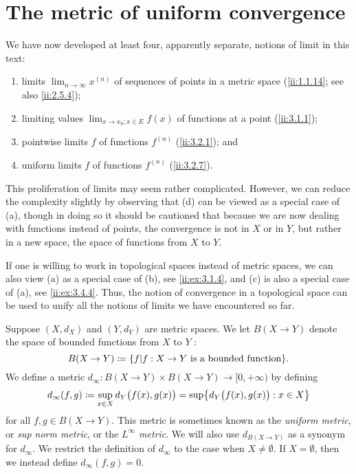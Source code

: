 \section{The metric of uniform convergence}\label{ii:sec:3.4}

\begin{note}
  We have now developed at least four, apparently separate, notions of limit in this text:
  \begin{enumerate}
    \item limits \(\lim_{n \to \infty} x^{(n)}\) of sequences of points in a metric space
          (\cref{ii:1.1.14};
          see also \cref{ii:2.5.4});
    \item limiting values \(\lim_{x \to x_0 ; x \in E} f(x)\) of functions at a point
          (\cref{ii:3.1.1});
    \item pointwise limits \(f\) of functions \(f^{(n)}\)
          (\cref{ii:3.2.1});
          and
    \item uniform limits \(f\) of functions \(f^{(n)}\)
          (\cref{ii:3.2.7}).
  \end{enumerate}

  This proliferation of limits may seem rather complicated.
  However, we can reduce the complexity slightly by observing that (d) can be viewed as a special case of (a), though in doing so it should be cautioned that because we are now dealing with functions instead of points, the convergence is not in \(X\) or in \(Y\), but rather in a new space, the space of functions from \(X\) to \(Y\).
\end{note}

\begin{rmk}\label{ii:3.4.1}
  If one is willing to work in topological spaces instead of metric spaces, we can also view (a) as a special case of (b), see \cref{ii:ex:3.1.4}, and (c) is also a special case of (a), see \cref{ii:ex:3.4.4}.
  Thus, the notion of convergence in a topological space can be used to unify all the notions of limits we have encountered so far.
\end{rmk}

\begin{defn}\label{ii:3.4.2}
  Suppose \((X, d_X)\) and \((Y, d_Y)\) are metric spaces.
  We let \(B(X \to Y)\) denote the space of bounded functions from \(X\) to \(Y\) :
  \[
    B(X \to Y) \coloneqq \set{f | f : X \to Y \text{ is a bounded function}}.
  \]
  We define a metric \(d_\infty : B(X \to Y) \times B(X \to Y) \to [0, +\infty)\) by defining
  \[
    d_\infty(f, g) \coloneqq \sup_{x \in X} d_Y\big(f(x), g(x)\big) = \sup\set{d_Y\big(f(x), g(x)\big) : x \in X}
  \]
  for all \(f, g \in B(X \to Y)\).
  This metric is sometimes known as the \emph{uniform metric}, or \emph{sup norm metric}, or the \emph{\(L^\infty\) metric}.
  We will also use \(d_{B(X \to Y)}\) as a synonym for \(d_\infty\).
  We restrict the definition of \(d_\infty\) to the case when \(X \neq \emptyset\).
  If \(X = \emptyset\), then we instead define \(d_\infty(f, g) = 0\).
\end{defn}


